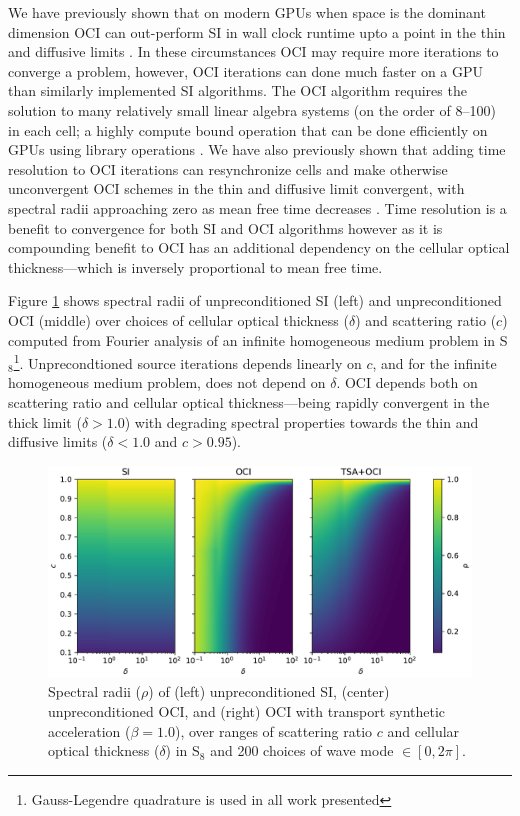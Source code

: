 We have previously shown that on modern GPUs when space is the dominant dimension OCI can out-perform SI in wall clock runtime upto a point in the thin and diffusive limits \cite{morgan2023oci}.
In these circumstances OCI may require more iterations to converge a problem, however, OCI iterations can done much faster on a GPU than similarly implemented SI algorithms.
The OCI algorithm requires the solution to many relatively small linear algebra systems (on the order of 8--100) in each cell; a highly compute bound operation that can be done efficiently on GPUs using library operations \cite{morgan_2025_oci}.
We have also previously shown that adding time resolution to OCI iterations can resynchronize cells and make otherwise unconvergent OCI schemes in the thin and diffusive limit convergent, with spectral radii approaching zero as mean free time decreases \cite{morgan_2025_oci}.
Time resolution is a benefit to convergence for both SI and OCI algorithms however as it is compounding benefit to OCI has an additional dependency on the cellular optical thickness---which is inversely proportional to mean free time.

Figure \ref{fig:ss_spec_rads} shows spectral radii of unpreconditioned SI (left) and unpreconditioned OCI (middle) over choices of cellular optical thickness ($\delta$) and scattering ratio ($c$) computed from Fourier analysis of an infinite homogeneous medium problem in S$_8$\footnote{Gauss-Legendre quadrature is used in all work presented}.
Unprecondtioned source iterations depends linearly on $c$, and for the infinite homogeneous medium problem, does not depend on $\delta$.
OCI depends both on scattering ratio and cellular optical thickness---being rapidly convergent in the thick limit ($\delta>1.0$) with degrading spectral properties towards the thin and diffusive limits ($\delta<1.0$ and $c>0.95$).

\begin{figure}
    \centering
    \includegraphics[width=\linewidth]{figures/smm_paper/ss_specrads.pdf}
    \caption{Spectral radii ($\rho$) of (left) unpreconditioned SI, (center) unpreconditioned OCI, and (right) OCI with transport synthetic acceleration ($\beta=1.0$), over ranges of scattering ratio $c$ and cellular optical thickness ($\delta$) in S$_8$ and 200 choices of wave mode $\in[0,2\pi]$. }
    \label{fig:ss_spec_rads}
\end{figure}

